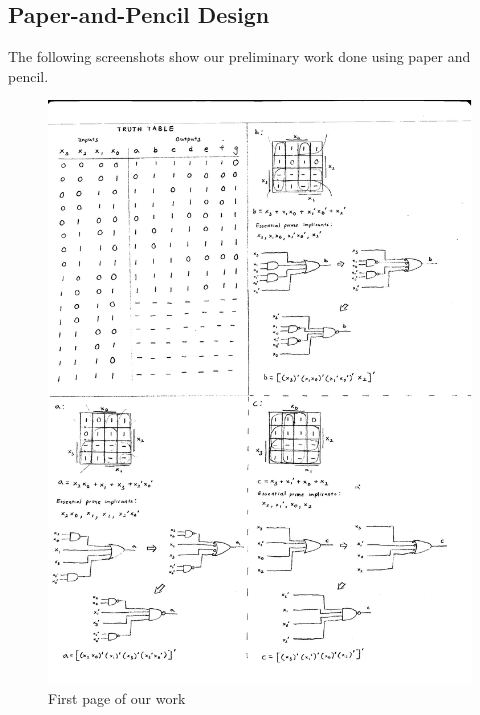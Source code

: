 \documentclass{article}
\begin{document}
\subsection{Paper-and-Pencil Design}
The following screenshots show our preliminary work done using paper and 
pencil.\\
\begin{figure}[h!]
\centering
\includegraphics[scale=0.5]{Worksheet(1)}
\caption{First page of our work}
\end{figure}
\end{document}

